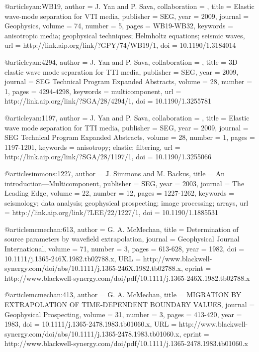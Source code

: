 {@article{yan:WB19,
author = {J. Yan and P. Sava},
collaboration = {},
title = {Elastic wave-mode separation for {VTI} media},
publisher = {SEG},
year = {2009},
journal = {Geophysics},
volume = {74},
number = {5},
pages = {WB19-WB32},
keywords = {anisotropic media; geophysical techniques; Helmholtz equations; seismic waves},
url = {http://link.aip.org/link/?GPY/74/WB19/1},
doi = {10.1190/1.3184014}
}




@article{yan:4294,
author = {J. Yan and P. Sava},
collaboration = {},
title = {3{D} elastic wave mode separation for {TTI} media},
publisher = {SEG},
year = {2009},
journal = {SEG Technical Program Expanded Abstracts},
volume = {28},
number = {1},
pages = {4294-4298},
keywords = {multicomponent},
url = {http://link.aip.org/link/?SGA/28/4294/1},
doi = {10.1190/1.3255781}
}







@article{yan:1197,
author = {J. Yan and P. Sava},
collaboration = {},
title = {Elastic wave mode separation for {TTI} media},
publisher = {SEG},
year = {2009},
journal = {SEG Technical Program Expanded Abstracts},
volume = {28},
number = {1},
pages = {1197-1201},
keywords = {anisotropy; elastic; filtering},
url = {http://link.aip.org/link/?SGA/28/1197/1},
doi = {10.1190/1.3255066}
}






@article{simmons:1227,
  author =	 {J. Simmons and M. Backus},
  title =	 {An introduction---{M}ulticomponent},
  publisher =	 {SEG},
  year =	 2003,
  journal =	 {The Leading Edge},
  volume =	 22,
  number =	 12,
  pages =	 {1227-1262},
  keywords =	 {seismology; data analysis; geophysical prospecting;
                  image processing; arrays},
  url =		 {http://link.aip.org/link/?LEE/22/1227/1},
  doi =		 {10.1190/1.1885531}
}

@article{mcmechan:613,
  author =	 {G. A. McMechan},
  title =	 {Determination of source parameters by wavefield
                  extrapolation},
  journal =	 {Geophysical Journal International},
  volume =	 71,
  number =	 3,
  pages =	 {613-628},
  year =	 1982,
  doi =		 {10.1111/j.1365-246X.1982.tb02788.x},
  URL =
                  {http://www.blackwell-synergy.com/doi/abs/10.1111/j.1365-246X.1982.tb02788.x},
  eprint =
                  {http://www.blackwell-synergy.com/doi/pdf/10.1111/j.1365-246X.1982.tb02788.x}
}

@article{mcmechan:413,
  author =	 {G. A. McMechan},
  title =	 {MIGRATION BY EXTRAPOLATION OF TIME-DEPENDENT
                  BOUNDARY VALUES},
  journal =	 {Geophysical Prospecting},
  volume =	 31,
  number =	 3,
  pages =	 {413-420},
  year =	 1983,
  doi =		 {10.1111/j.1365-2478.1983.tb01060.x},
  URL =
                  {http://www.blackwell-synergy.com/doi/abs/10.1111/j.1365-2478.1983.tb01060.x},
  eprint =
                  {http://www.blackwell-synergy.com/doi/pdf/10.1111/j.1365-2478.1983.tb01060.x}
}

}
